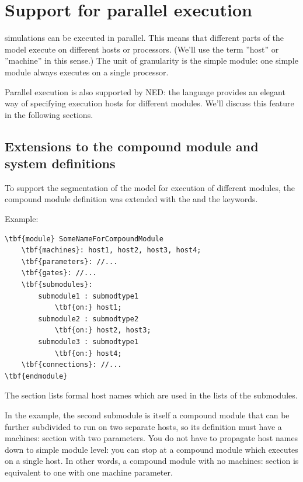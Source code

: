 \section{Support for parallel execution}

\opp simulations can be executed in parallel. This means that different parts of the model execute on
different hosts or processors.  (We'll use the term ''host'' or
''machine'' in this sense.) The unit of granularity is the
simple module: one simple
module always executes on a single processor.


Parallel execution is also supported by NED: the language provides
an elegant way of specifying execution hosts for different modules.
We'll discuss this feature in the following sections.





\subsection{Extensions to the compound module and system definitions}

To support the segmentation of the model for
execution of different modules, the compound module definition was
extended with the  and the  keywords.

Example:
\begin{Verbatim}[commandchars=\\\{\}]
\tbf{module} SomeNameForCompoundModule
    \tbf{machines}: host1, host2, host3, host4;
    \tbf{parameters}: //...
    \tbf{gates}: //...
    \tbf{submodules}:
        submodule1 : submodtype1
            \tbf{on:} host1;
        submodule2 : submodtype2
            \tbf{on:} host2, host3;
        submodule3 : submodtype1
            \tbf{on:} host4;
    \tbf{connections}: //...
\tbf{endmodule}
\end{Verbatim}


The  section lists formal host
names which are used in the  lists of the
submodules.


In the example, the second submodule is itself a compound module that
can be further subdivided to run on two separate hosts, so its
definition must have a machines: section with two parameters.  You do
not have to propagate host names down to simple module level: you can
stop at a compound module which executes on a single host. In other
words, a compound module with no machines: section is equivalent to
one with one machine parameter.


